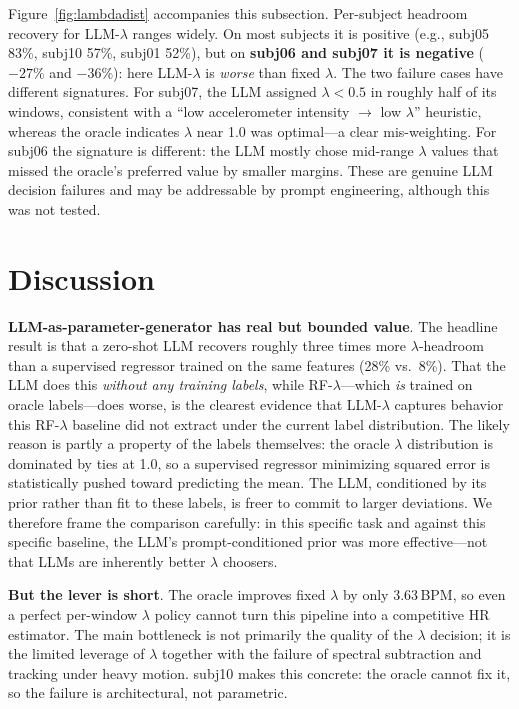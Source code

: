 \documentclass[sigconf,nonacm,11pt]{acmart}
\begin{document}
Figure~\ref{fig:lambdadist} accompanies this subsection. Per-subject headroom recovery for LLM-$\lambda$ ranges widely. On most subjects it is positive (e.g., subj05 83\%, subj10 57\%, subj01 52\%), but on \textbf{subj06 and subj07 it is negative} ($-27\%$ and $-36\%$): here LLM-$\lambda$ is \emph{worse} than fixed $\lambda$. The two failure cases have different signatures. For subj07, the LLM assigned $\lambda < 0.5$ in roughly half of its windows, consistent with a ``low accelerometer intensity $\to$ low $\lambda$'' heuristic, whereas the oracle indicates $\lambda$ near 1.0 was optimal---a clear mis-weighting. For subj06 the signature is different: the LLM mostly chose mid-range $\lambda$ values that missed the oracle's preferred value by smaller margins. These are genuine LLM decision failures and may be addressable by prompt engineering, although this was not tested.

\section{Discussion}

\textbf{LLM-as-parameter-generator has real but bounded value}. The headline result is that a zero-shot LLM recovers roughly three times more $\lambda$-headroom than a supervised regressor trained on the same features (28\% vs.\ 8\%). That the LLM does this \emph{without any training labels}, while RF-$\lambda$---which \emph{is} trained on oracle labels---does worse, is the clearest evidence that LLM-$\lambda$ captures behavior this RF-$\lambda$ baseline did not extract under the current label distribution. The likely reason is partly a property of the labels themselves: the oracle $\lambda$ distribution is dominated by ties at 1.0, so a supervised regressor minimizing squared error is statistically pushed toward predicting the mean. The LLM, conditioned by its prior rather than fit to these labels, is freer to commit to larger deviations. We therefore frame the comparison carefully: in this specific task and against this specific baseline, the LLM's prompt-conditioned prior was more effective---not that LLMs are inherently better $\lambda$ choosers.

\textbf{But the lever is short}. The oracle improves fixed $\lambda$ by only 3.63\,BPM, so even a perfect per-window $\lambda$ policy cannot turn this pipeline into a competitive HR estimator. The main bottleneck is not primarily the quality of the $\lambda$ decision; it is the limited leverage of $\lambda$ together with the failure of spectral subtraction and tracking under heavy motion. subj10 makes this concrete: the oracle cannot fix it, so the failure is architectural, not parametric.
\end{document}
